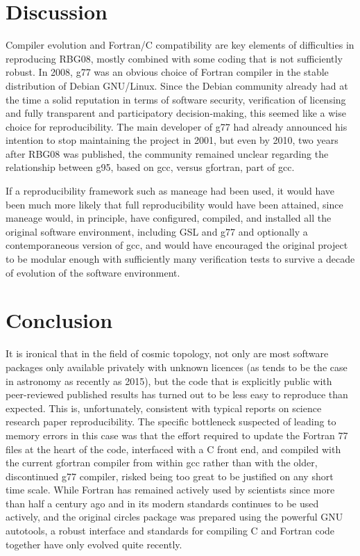 \section{Discussion}

Compiler evolution and Fortran/C compatibility are key elements of
difficulties in reproducing RBG08, mostly combined with some coding
that is not sufficiently robust. In 2008, {\sc g77} was an obvious
choice of Fortran compiler in the stable distribution of Debian
GNU/Linux. Since the Debian community already had at the time a solid
reputation in terms of software security, verification of licensing
and fully transparent and participatory decision-making, this seemed
like a wise choice for reproducibility.  The main developer of {\sc
  g77} had already announced his intention to stop maintaining the
project in 2001\supercite{Burley01g77}, but even by 2010, two years
after RBG08 was published, the community remained unclear regarding
the relationship between {\sc g95}, based on {\sc gcc}, versus
{\sc gfortran}, part of {\sc gcc}\supercite{Bosscher10g95}.

If a reproducibility framework such as {\sc maneage} had been
used\supercite{Akhlaghi2020}, it would have been much more likely that full
reproducibility would have been attained, since {\sc maneage} would,
in principle, have configured, compiled, and installed all the
original software environment, including {\sc GSL} and {\sc g77} and
optionally a contemporaneous version of {\sc gcc}, and would have
encouraged the original project to be modular enough with sufficiently
many verification tests to survive a decade of evolution of
the software environment.

\section{Conclusion}

\fussy
It is ironical that in the field of cosmic topology, not only are most
software packages only available privately with unknown licences
(as tends to be the case in astronomy as recently as 2015\supercite{Allen18}),
but the code that is explicitly public with peer-reviewed published
results has turned out to be less easy to reproduce than
expected. This is, unfortunately, consistent with typical reports on
science research paper reproducibility\supercite{Ioannidis2009,Chang15,Stodden18}.
The specific bottleneck
suspected of leading to memory errors in this case was that the effort
required to update the Fortran 77 files at the heart of the code,
interfaced with a C front end,
and compiled with the current {\sc gfortran} compiler from within {\sc gcc}
rather than with the older, discontinued\supercite{Burley01g77} {\sc g77}
compiler, risked being too great to be justified
on any short time scale. While Fortran has remained actively used by
scientists since more than half a century ago and in its modern
standards continues to be used actively, and the original {\sc
  circles} package was prepared using the powerful GNU {\sc
  autotools}, a robust interface and standards for compiling C and
Fortran code together have only evolved quite recently.

